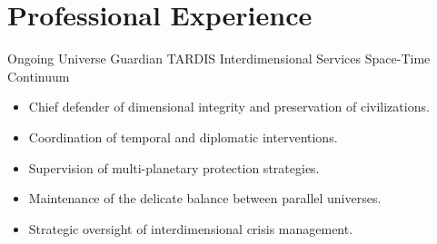 \section*{Professional Experience}
\cventry
{Ongoing}%
{Universe Guardian}%
{TARDIS Interdimensional Services}%
{Space-Time Continuum}%
{%
  \begin{itemize}%
    \item Chief defender of dimensional integrity and preservation of civilizations.
    \item Coordination of temporal and diplomatic interventions.
    \item Supervision of multi-planetary protection strategies.
    \item Maintenance of the delicate balance between parallel universes.
    \item Strategic oversight of interdimensional crisis management.
  \end{itemize}%
}{}%

